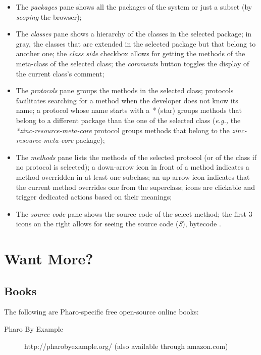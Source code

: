 \documentclass[notumble]{leaflet}
\newcommand{\eg}{\emph{e.g.,}\xspace}
\begin{document}
\begin{itemize}
\item The \emph{packages} pane shows all the packages of the system or
  just a subset (by \emph{scoping} the browser);
\item The \emph{classes} pane shows a hierarchy of the classes in the
  selected package; in gray, the classes that are extended in the
  selected package but that belong to another one; the \emph{class
    side} checkbox allows for getting the methods of the meta-class of
  the selected class; the \emph{comments} button toggles the display
  of the current class's comment;
\item The \emph{protocols} pane groups the methods in the selected
  class; protocols facilitates searching for a method when the
  developer does not know its name; a protocol whose name starts with a
  \emph{*} (star) groups methods that belong to a different package
  than the one of the selected class (\eg the
  \emph{*zinc-resource-meta-core} protocol groups methods that belong
  to the \emph{zinc-resource-meta-core} package);
\item The \emph{methods} pane lists the methods of the selected
  protocol (or of the class if no protocol is selected); a down-arrow
  icon in front of a method indicates a method overridden in at least
  one subclass; an up-arrow icon indicates that the current method
  overrides one from the superclass; icons are clickable and trigger
  dedicated actions based on their meanings;
\item The \emph{source code} pane shows the source code of the select
  method; the first 3 icons on the right allows for seeing the source
  code (\emph{S}), bytecode .
\end{itemize}

\section{Want More?}

\subsection{Books}

The following are Pharo-specific free open-source online books:

\begin{description}
\item[Pharo By Example] http://pharobyexample.org/ (also available
  through amazon.com)
\end{description}
\end{document}
